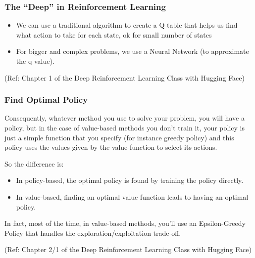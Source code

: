 





\begin{frame}[fragile]\frametitle{The ``Deep'' in Reinforcement Learning}

\begin{itemize}
\item We can use a traditional algorithm to create a Q table that helps us find what action to take for each state, ok for small number of states
\item For bigger and complex problems, we use a Neural Network (to approximate the q value).
\end{itemize}


{\tiny (Ref: Chapter 1 of the Deep Reinforcement Learning Class with Hugging Face)}


\end{frame}

\begin{frame}[fragile]\frametitle{Find Optimal Policy}

Consequently, whatever method you use to solve your problem, you will have a policy, but in the case of value-based methods you don't train it, your policy is just a simple function that you specify (for instance greedy policy) and this policy uses the values given by the value-function to select its actions.

So the difference is:
\begin{itemize}
\item In policy-based, the optimal policy is found by training the policy directly.
\item In value-based, finding an optimal value function leads to having an optimal policy.
\end{itemize}

In fact, most of the time, in value-based methods, you'll use an Epsilon-Greedy Policy that handles the exploration/exploitation trade-off.

{\tiny (Ref: Chapter 2/1 of the Deep Reinforcement Learning Class with Hugging Face)}


\end{frame}


